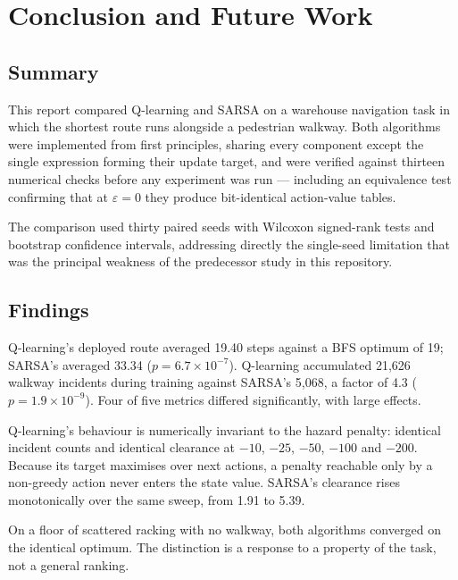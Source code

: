 \chapter{Conclusion and Future Work}
\label{ch:conclusion}

\section{Summary}

This report compared Q-learning and SARSA on a warehouse navigation task in which the shortest
route runs alongside a pedestrian walkway. Both algorithms were implemented from first principles,
sharing every component except the single expression forming their update target, and were verified
against thirteen numerical checks before any experiment was run --- including an equivalence test
confirming that at $\varepsilon = 0$ they produce bit-identical action-value tables.

The comparison used thirty paired seeds with Wilcoxon signed-rank tests and bootstrap confidence
intervals, addressing directly the single-seed limitation that was the principal weakness of the
predecessor study in this repository.

\section{Findings}

 Q-learning's deployed route averaged 19.40 steps against a BFS optimum of 19; SARSA's
averaged 33.34 ($p = 6.7\times10^{-7}$). Q-learning accumulated 21{,}626 walkway incidents during
training against SARSA's 5{,}068, a factor of 4.3 ($p = 1.9\times10^{-9}$). Four of five metrics
differed significantly, with large effects.

 Q-learning's
behaviour is numerically invariant to the hazard penalty: identical incident counts and identical
clearance at $-10$, $-25$, $-50$, $-100$ and $-200$. Because its target maximises over next
actions, a penalty reachable only by a non-greedy action never enters the state value. SARSA's
clearance rises monotonically over the same sweep, from 1.91 to 5.39.

 On a
floor of scattered racking with no walkway, both algorithms converged on the identical optimum.
The distinction is a response to a property of the task, not a general ranking.

